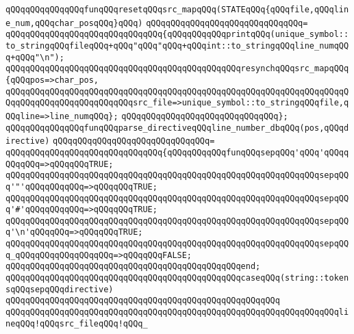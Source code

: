 \newline
\verb|qQQqqQQqqQQqqQQqfunqQQqresetqQQqsrc_mapqQQq(STATEqQQq{qQQqfile,qQQqline_num,qQQqchar_posqQQq}qQQq)|\newline
\verb|qQQqqQQqqQQqqQQqqQQqqQQqqQQqqQQq=|\newline
\verb|qQQqqQQqqQQqqQQqqQQqqQQqqQQqqQQq{qQQqqQQqqQQqprintqQQq(unique_symbol::to_stringqQQqfileqQQq+qQQq"qQQq"qQQq+qQQqint::to_stringqQQqline_numqQQq+qQQq"\n");|\newline
\newline
\verb|qQQqqQQqqQQqqQQqqQQqqQQqqQQqqQQqqQQqqQQqqQQqqQQqresynchqQQqsrc_mapqQQq{qQQqpos=>char_pos,|\newline
\verb|qQQqqQQqqQQqqQQqqQQqqQQqqQQqqQQqqQQqqQQqqQQqqQQqqQQqqQQqqQQqqQQqqQQqqQQqqQQqqQQqqQQqqQQqqQQqqQQqsrc_file=>unique_symbol::to_stringqQQqfile,qQQqline=>line_numqQQq};|\newline
\verb|qQQqqQQqqQQqqQQqqQQqqQQqqQQqqQQq};|\newline
\newline
\verb|qQQqqQQqqQQqqQQqfunqQQqparse_directiveqQQqline_number_dbqQQq(pos,qQQqdirective)|\newline
\verb|qQQqqQQqqQQqqQQqqQQqqQQqqQQqqQQq=|\newline
\verb|qQQqqQQqqQQqqQQqqQQqqQQqqQQqqQQq{qQQqqQQqqQQqfunqQQqsepqQQq'qQQq'qQQqqQQqqQQq=>qQQqqQQqTRUE;|\newline
\verb|qQQqqQQqqQQqqQQqqQQqqQQqqQQqqQQqqQQqqQQqqQQqqQQqqQQqqQQqqQQqqQQqsepqQQq'"'qQQqqQQqqQQq=>qQQqqQQqTRUE;|\newline
\verb|qQQqqQQqqQQqqQQqqQQqqQQqqQQqqQQqqQQqqQQqqQQqqQQqqQQqqQQqqQQqqQQqsepqQQq'#'qQQqqQQqqQQq=>qQQqqQQqTRUE;|\newline
\verb|qQQqqQQqqQQqqQQqqQQqqQQqqQQqqQQqqQQqqQQqqQQqqQQqqQQqqQQqqQQqqQQqsepqQQq'\n'qQQqqQQq=>qQQqqQQqTRUE;|\newline
\newline
\verb|qQQqqQQqqQQqqQQqqQQqqQQqqQQqqQQqqQQqqQQqqQQqqQQqqQQqqQQqqQQqqQQqsepqQQq_qQQqqQQqqQQqqQQqqQQq=>qQQqqQQqFALSE;|\newline
\verb|qQQqqQQqqQQqqQQqqQQqqQQqqQQqqQQqqQQqqQQqqQQqqQQqend;|\newline
\newline
\verb|qQQqqQQqqQQqqQQqqQQqqQQqqQQqqQQqqQQqqQQqqQQqqQQqcaseqQQq(string::tokensqQQqsepqQQqdirective)|\newline
\verb|qQQqqQQqqQQqqQQqqQQqqQQqqQQqqQQqqQQqqQQqqQQqqQQqqQQqqQQq|\newline
\verb|qQQqqQQqqQQqqQQqqQQqqQQqqQQqqQQqqQQqqQQqqQQqqQQqqQQqqQQqqQQqqQQqqQQqlineqQQq!qQQqsrc_fileqQQq!qQQq_|\newline
